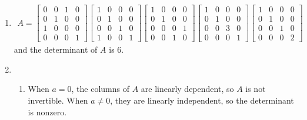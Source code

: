 \documentclass[red]{tutorial}
\makeatletter
\DeclarePairedDelimiter\norm{\lVert}{\rVert}
\DeclarePairedDelimiter\abs{\lvert}{\rvert}
\let\oldnorm\norm
\def\norm{\@ifstar{\oldnorm}{\oldnorm*}}
\let\oldabs\abs
\def\abs{\@ifstar{\oldabs}{\oldabs*}}
\theoremstyle{definition}
\theoremstyle{theorem}
\makeatother
\begin{document}
\begin{solutions}
\begin{enumerate}
\begin{enumerate}
\begin{align*}
            = \abs{\lambda}\cdot\norm*{T(x)}
            = \lambda \norm*{T(x)}
          \end{align*}
          which establishes almost linearity.
      \end{enumerate}
    \item
      \begin{align*}
        A = 
        \begin{bmatrix}
          0 & 0 & 1 & 0 \\
          0 & 1 & 0 & 0 \\
          1 & 0 & 0 & 0 \\
          0 & 0 & 0 & 1
        \end{bmatrix}
        \begin{bmatrix}
          1 & 0 & 0 & 0 \\
          0 & 1 & 0 & 0 \\
          0 & 0 & 1 & 0 \\
          1 & 0 & 0 & 1
        \end{bmatrix}
        \begin{bmatrix}
          1 & 0 & 0 & 0 \\
          0 & 1 & 0 & 0 \\
          0 & 0 & 0 & 1 \\
          0 & 0 & 1 & 0
        \end{bmatrix}
        \begin{bmatrix}
          1 & 0 & 0 & 0 \\
          0 & 1 & 0 & 0 \\
          0 & 0 & 3 & 0 \\
          0 & 0 & 0 & 1
        \end{bmatrix}
        \begin{bmatrix}
          1 & 0 & 0 & 0 \\
          0 & 1 & 0 & 0 \\
          0 & 0 & 1 & 0 \\
          0 & 0 & 0 & 2
        \end{bmatrix}
      \end{align*}
      and the determinant of $A$ is $6$. %
    \item 
      \begin{enumerate}
        \item
          When $a=0$, the columns of $A$ are linearly dependent, so $A$ is not
          invertible. When $a\neq 0$, they are linearly independent, so the
          determinant is nonzero.

\end{enumerate}
\end{enumerate}
\end{solutions}
\end{document}
